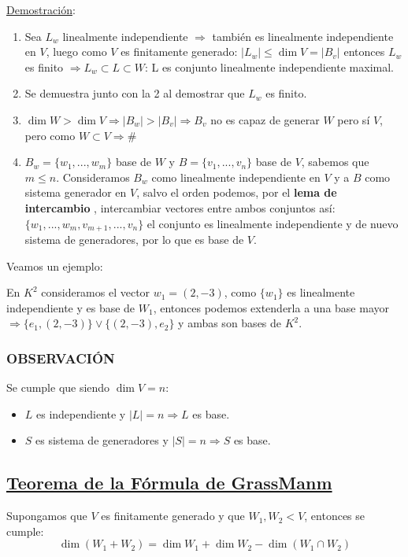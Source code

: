 \documentclass[10pt,a4paper,openright]{book}
\begin{document}
\underline{Demostración}:
\begin{enumerate}
\item Sea $L_w$ linealmente independiente $\Rightarrow $ también es linealmente independiente en $V$, luego como $V$ es finitamente generado: $|L_w|\leq \dim V=|B_v|$ entonces $L_w$ es finito $\Rightarrow L_w\subset L\subset W$: L es conjunto linealmente independiente maximal.

\item Se demuestra junto con la 2 al demostrar que $L_w$ es finito.

\item $\dim W>\dim V\Rightarrow |B_w|>|B_v|\Rightarrow B_v$ no es capaz de generar $W$ pero sí $V$, pero como $W\subset V\Rightarrow \#$

\item $B_w=\{w_1,..., w_m\}$ base de $W$ y $B=\{v_1,..., v_n\}$ base de $V$, sabemos que $m\leq n$. Consideramos $B_w$ como linealmente independiente en $V$ y a $B$ como sistema generador en $V$, salvo el orden podemos, por el \textbf{lema de intercambio} , intercambiar vectores entre ambos conjuntos así: $\{w_1, ... , w_m, v_{m+1}, ... , v_n \}$ el conjunto es linealmente independiente y de nuevo sistema de generadores, por lo que es base de $V$.
\end{enumerate}

Veamos un ejemplo:\par
En $K^2$ consideramos el vector $w_1=(2,-3)$, como $\{w_1\}$ es linealmente independiente y es base de $W_1$, entonces podemos extenderla a una base mayor $\Rightarrow \{e_1,(2,-3)\} \vee \{(2,-3), e_2\}$ y ambas son bases de $K^2$.

\subsubsection*{OBSERVACIÓN}
Se cumple que siendo $\dim V=n$:
\begin{itemize}
\item $L$ es independiente y $|L|=n \Rightarrow L$ es base.
\item $S$ es sistema de generadores y $|S|=n\Rightarrow S $ es base. 
\end{itemize}

\subsection*{\underline{Teorema de la Fórmula de GrassManm}}
Supongamos que $V$ es finitamente generado y que $W_1, W_2<V$, entonces se cumple:
$$\dim (W_1+W_2)=\dim W_1+\dim W_2-\dim (W_1\cap W_2)$$
\end{document}
